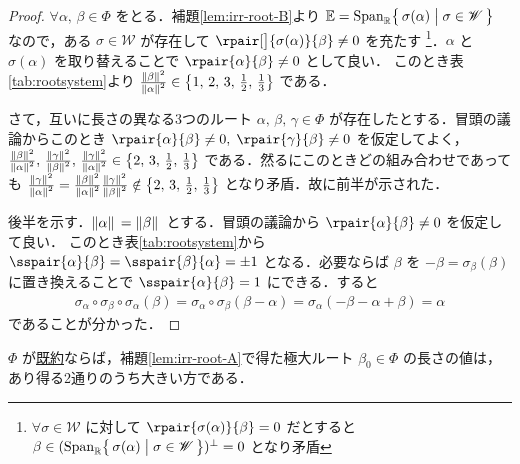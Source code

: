 \documentclass[rep_main]{subfiles}
\begin{document}
\begin{proof}
	$\forall \alpha,\, \beta \in \Phi$ をとる．補題\ref{lem:irr-root-B}より $\mathbb{E} = \operatorname{Span}_{\mathbb{R}} \bigl\{\, \sigma(\alpha) \bigm| \sigma \in \mathscr{W} \,\bigr\}$ なので，ある $\sigma \in \mathscr{W}$ が存在して $\rpair[\big]{\sigma(\alpha)}{\beta} \neq 0$ を充たす
	\footnote{$\forall \sigma \in \mathscr{W}$ に対して $\rpair{\sigma(\alpha)}{\beta} = 0$ だとすると $\beta \in (\operatorname{Span}_{\mathbb{R}} \bigl\{\, \sigma(\alpha) \bigm| \sigma \in \mathscr{W} \,\bigr\})^\perp = 0$ となり矛盾}．$\alpha$ と $\sigma(\alpha)$ を取り替えることで
	$\rpair{\alpha}{\beta} \neq 0$ として良い．
	このとき表\ref{tab:rootsystem}より $\frac{\norm*{\beta}^2}{\norm*{\alpha}^2} \in \bigl\{ 1,\, 2,\, 3,\, \frac{1}{2},\, \frac{1}{3} \bigr\}$ である．

	さて，互いに長さの異なる3つのルート $\alpha,\, \beta,\, \gamma \in \Phi$ が存在したとする．冒頭の議論からこのとき $\rpair{\alpha}{\beta} \neq 0,\; \rpair{\gamma}{\beta} \neq 0$ を仮定してよく，$\frac{\norm*{\beta}^2}{\norm*{\alpha}^2},\, \frac{\norm*{\gamma}^2}{\norm*{\beta}^2},\, \frac{\norm*{\gamma}^2}{\norm*{\alpha}^2} \in \bigl\{ 2,\, 3,\, \frac{1}{2},\, \frac{1}{3}\bigr\}$ である．然るにこのときどの組み合わせであっても $\frac{\norm*{\gamma}^2}{\norm*{\alpha}^2} = \frac{\norm*{\beta}^2}{\norm*{\alpha}^2} \frac{\norm*{\gamma}^2}{\norm*{\beta}^2} \notin \bigl\{ 2,\, 3,\, \frac{1}{2},\, \frac{1}{3}\bigr\}$ となり矛盾．故に前半が示された．

	後半を示す．$\norm*{\alpha}	= \norm*{\beta}$ とする．冒頭の議論から $\rpair{\alpha}{\beta} \neq 0$ を仮定して良い．
	このとき表\ref{tab:rootsystem}から $\sspair{\alpha}{\beta} = \sspair{\beta}{\alpha} = \pm 1$ となる．必要ならば $\beta$ を $-\beta = \sigma_\beta(\beta)$ に置き換えることで $\sspair{\alpha}{\beta} = 1$ にできる．すると
	\begin{align}
		\sigma_\alpha \circ \sigma_\beta \circ \sigma_\alpha (\beta)
		= \sigma_\alpha \circ \sigma_\beta (\beta - \alpha) = \sigma_\alpha(- \beta - \alpha + \beta) = \alpha
	\end{align}
	であることが分かった．
\end{proof}


\begin{mylem}[label=lem:irr-root-D]{}
	$\Phi$ が\hyperref[def:irr-root]{既約}ならば，補題\ref{lem:irr-root-A}で得た極大ルート $\beta_0 \in \Phi$ の長さの値は，あり得る2通りのうち大きい方である．
\end{mylem}
\end{document}
